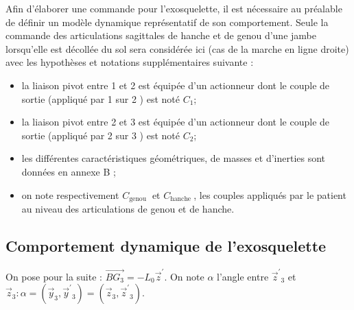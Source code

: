 Afin d'élaborer une commande pour l'exosquelette, il est nécessaire au préalable de définir un modèle dynamique représentatif de son comportement. Seule la commande des articulations sagittales de hanche et de genou d'une jambe lorsqu'elle est décollée du sol %
sera considérée ici (cas de la marche en ligne droite) avec les hypothèses et notations supplémentaires suivante :
\begin{itemize}
  \item la liaison pivot entre 1 et 2 est équipée d'un actionneur dont le couple de sortie (appliqué par 1 sur 2 ) est noté $C_{1}$;
  \item la liaison pivot entre 2 et 3 est équipée d'un actionneur dont le couple de sortie (appliqué par 2 sur 3 ) est noté $C_{2}$;
  \item les différentes caractéristiques géométriques, de masses et d'inerties sont données en annexe B ;
  \item on note respectivement $C_{\text {genou }}$ et $C_{\text {hanche }}$, les couples appliqués par le patient au niveau des articulations de genou et de hanche.
\end{itemize}


\subsection*{Comportement dynamique de l'exosquelette}
On pose pour la suite : $\overrightarrow{B G_{3}}=-L_{0} \vec{z}^{\prime}$. On note $\alpha$ l'angle entre $\vec{z}^{\prime}{ }_{3}$ et $\vec{z}_{3}: \alpha=\left(\vec{y}_{3}, \vec{y}^{\prime}{ }_{3}\right)=\left(\vec{z}_{3}, \vec{z}^{\prime}{ }_{3}\right)$.





